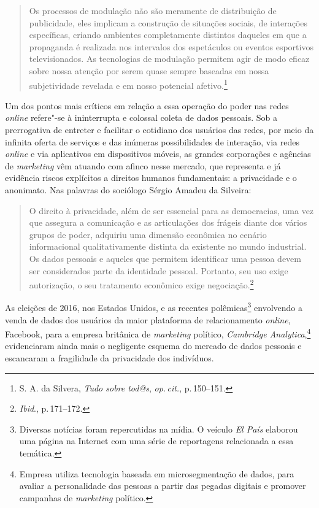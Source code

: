 \begin{quote}
Os processos de modulação não são meramente de distribuição de
publicidade, eles implicam a construção de situações sociais, de
interações específicas, criando ambientes completamente distintos
daqueles em que a propaganda é realizada nos intervalos dos espetáculos
ou eventos esportivos televisionados. As tecnologias de modulação
permitem agir de modo eficaz sobre nossa atenção por serem quase sempre
baseadas em nossa subjetividade revelada e em nosso potencial afetivo.\footnote{S. A. da Silvera, \textit{Tudo sobre tod@s}, \textit{op.\,cit.}, p.\,150--151.}
\end{quote}

Um dos pontos mais críticos em relação a essa operação do poder nas
redes \textit{online} refere"-se à ininterrupta e colossal coleta de dados
pessoais. Sob a prerrogativa de entreter e facilitar o cotidiano dos
usuários das redes, por meio da infinita oferta de serviços e das
inúmeras possibilidades de interação, via redes \textit{online} e via aplicativos
em dispositivos móveis, as grandes corporações e agências de \textit{marketing}
vêm atuando com afinco nesse mercado, que representa e já evidência
riscos explícitos a direitos humanos fundamentais: a privacidade e o
anonimato. Nas palavras do sociólogo Sérgio Amadeu da Silveira:

\begin{quote}
O direito à privacidade, além de ser essencial para as democracias, uma
vez que assegura a comunicação e as articulações dos frágeis diante dos
vários grupos de poder, adquiriu uma dimensão econômica no cenário
informacional qualitativamente distinta da existente no mundo
industrial. Os dados pessoais e aqueles que permitem identificar uma
pessoa devem ser considerados parte da identidade pessoal. Portanto, seu
uso exige autorização, o seu tratamento econômico exige negociação.\footnote{\textit{Ibid}., p.\,171--172.}
\end{quote}

As eleições de 2016, nos Estados Unidos, e as recentes
polêmicas\footnote{Diversas notícias foram repercutidas na mídia. O
  veículo \textit{El País} elaborou uma página na Internet com uma série de
  reportagens relacionada a essa temática.} envolvendo a venda de dados
dos usuários da maior plataforma de relacionamento \textit{online}, Facebook,
para a empresa britânica de \textit{marketing} político, \textit{Cambridge
Analytica},\footnote{Empresa utiliza tecnologia baseada em
  microsegmentação de dados, para avaliar a personalidade das pessoas a
  partir das pegadas digitais e promover campanhas de \textit{marketing}
  político.} evidenciaram ainda mais o negligente esquema do
mercado de dados pessoais e escancaram a fragilidade da privacidade dos
indivíduos.

